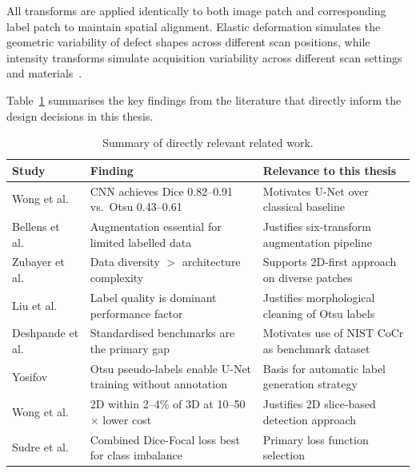 All transforms are applied identically to both image patch and corresponding label patch to maintain
spatial alignment. Elastic deformation simulates the geometric variability of defect shapes across
different scan positions, while intensity transforms simulate acquisition variability across
different scan settings and materials~\citep{Bellens2021}.

Table~\ref{tab:related_work_summary} summarises the key findings from the literature that directly
inform the design decisions in this thesis.

\begin{table}[htbp]
\centering
\caption{Summary of directly relevant related work.}
\label{tab:related_work_summary}
\small
\begin{tabular}{p{2.6cm}p{5.4cm}p{5.4cm}}
\toprule
\textbf{Study} & \textbf{Finding} & \textbf{Relevance to this thesis} \\
\midrule
Wong et al.~\citep{Wong2022} & CNN achieves Dice 0.82--0.91 vs.\ Otsu 0.43--0.61 & Motivates U-Net
  over classical baseline \\
Bellens et al.~\citep{Bellens2021} & Augmentation essential for limited labelled data & Justifies
  six-transform augmentation pipeline \\
Zubayer et al.~\citep{Zubayer2023} & Data diversity $>$ architecture complexity & Supports 2D-first
  approach on diverse patches \\
Liu et al.~\citep{Liu2024} & Label quality is dominant performance factor & Justifies morphological
  cleaning of Otsu labels \\
Deshpande et al.~\citep{Deshpande2024} & Standardised benchmarks are the primary gap & Motivates use
  of NIST CoCr as benchmark dataset \\
Yosifov~\citep{Yosifov2020} & Otsu pseudo-labels enable U-Net training without annotation & Basis
  for automatic label generation strategy \\
Wong et al.~\citep{Wong2021} & 2D within 2--4\% of 3D at 10--50$\times$ lower cost & Justifies 2D
  slice-based detection approach \\
Sudre et al.~\citep{Sudre2017} & Combined Dice-Focal loss best for class imbalance & Primary loss
  function selection \\
\bottomrule
\end{tabular}
\end{table}

